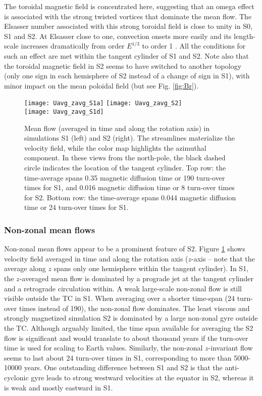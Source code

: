 \documentclass[12pt, a4paper]{article}
\begin{document}
The toroidal magnetic field is concentrated here, suggesting that an omega effect is associated with the strong twisted vortices that dominate the mean flow.
The Elsasser number associated with this strong toroidal field is close to unity in S0, S1 and S2.
At Elsasser close to one, convection onsets more easily and its length-scale increases dramatically from order $E^{1/3}$ to order 1 \citep{chandrasekhar1961,busse2011,aujogue2015}.
All the conditions for such an effect are met within the tangent cylinder of S1 and S2.
Note also that the toroidal magnetic field in S2 seems to have switched to another topology (only one sign in each hemisphere of S2 instead of a change of sign in S1), with minor impact on the mean poloidal field (but see Fig. \ref{fig:Br}).

\begin{figure}
\texttt{[image: Uavg\_zavg\_S1a]}
\texttt{[image: Uavg\_zavg\_S2]} \\
\texttt{[image: Uavg\_zavg\_S1d]}
\caption{Mean flow (averaged in time and along the rotation axis) in simulations S1 (left) and S2 (right).
The streamlines materialize the velocity field, while the color map highlights the azimuthal component.
In these views from the north-pole, the black dashed circle indicates the location of the tangent cylinder.
Top row: the time-average spans 0.35 magnetic diffusion time or 190 turn-over times for S1, and 0.016 magnetic diffusion time or 8 turn-over times for S2.
Bottom row:  the time-average spans 0.044 magnetic diffusion time or 24 turn-over times for S1.
}
\label{fig:Uavg_zavg}
\end{figure}

\subsubsection{Non-zonal mean flows}
Non-zonal mean flows appear to be a prominent feature of S2.
Figure \ref{fig:Uavg_zavg} shows velocity field averaged in time and along the rotation axis ($z$-axis -- note that the average along $z$ spans only one hemisphere within the tangent cylinder).
In S1, the $z$-averaged mean flow is dominated by a prograde jet at the tangent cylinder and a retrograde circulation within.
A weak large-scale non-zonal flow is still visible outside the TC in S1.
When averaging over a shorter time-span (24 turn-over times instead of 190), the non-zonal flow dominates.
The least viscous and strongly magnetized simulation S2 is dominated by a large non-zonal gyre outside the TC.
Although arguably limited, the time span available for averaging the S2 flow is significant and would translate to about thousand years if the turn-over time is used for scaling to Earth values.
Similarly, the non-zonal $z$-invariant flow seems to last about 24 turn-over times in S1, corresponding to more than 5000-10000 years.
One outstanding difference between S1 and S2 is that the anti-cyclonic gyre leads to strong westward velocities at the equator in S2, whereas it is weak and mostly eastward in S1.
\end{document}
